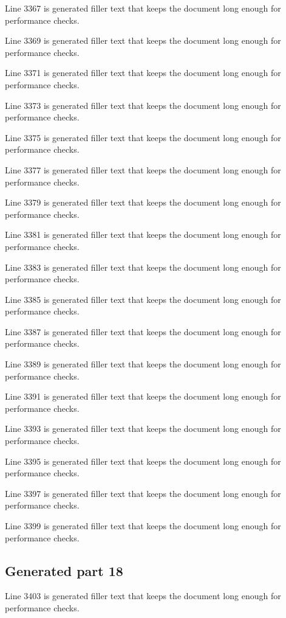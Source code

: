 Line 3367 is generated filler text that keeps the document long enough for performance checks.

Line 3369 is generated filler text that keeps the document long enough for performance checks.

Line 3371 is generated filler text that keeps the document long enough for performance checks.

Line 3373 is generated filler text that keeps the document long enough for performance checks.

Line 3375 is generated filler text that keeps the document long enough for performance checks.

Line 3377 is generated filler text that keeps the document long enough for performance checks.

Line 3379 is generated filler text that keeps the document long enough for performance checks.

Line 3381 is generated filler text that keeps the document long enough for performance checks.

Line 3383 is generated filler text that keeps the document long enough for performance checks.

Line 3385 is generated filler text that keeps the document long enough for performance checks.

Line 3387 is generated filler text that keeps the document long enough for performance checks.

Line 3389 is generated filler text that keeps the document long enough for performance checks.

Line 3391 is generated filler text that keeps the document long enough for performance checks.

Line 3393 is generated filler text that keeps the document long enough for performance checks.

Line 3395 is generated filler text that keeps the document long enough for performance checks.

Line 3397 is generated filler text that keeps the document long enough for performance checks.

Line 3399 is generated filler text that keeps the document long enough for performance checks.

\subsection{Generated part 18}

Line 3403 is generated filler text that keeps the document long enough for performance checks.

